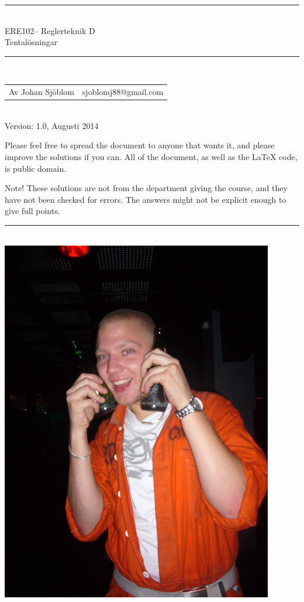 \documentclass[a4paper]{article}
\newcommand{\coursecode}{ERE102}
\newcommand{\coursename}{Reglerteknik D}
\newcommand{\doctitle}{Tentalösningar}
\newcommand{\horrule}[1]{\rule{\linewidth}{#1}} %
\begin{document}
\thispagestyle{plain} %


\begin{center}
\horrule{0.5pt} \\[0.3cm] %
%
\huge  \coursecode -- \coursename \\[1mm]
\Large \doctitle
\normalsize %

\horrule{2pt} \\[0.1cm] %

\begin{tabular}{ l r }
  Av Johan Sjöblom & sjoblomj88@gmail.com
\end{tabular}\\[0.1cm]
\footnotesize Version: 1.0, Augusti 2014\\[0.4cm]

\end{center}
{\footnotesize
Please feel free to spread the document to anyone that wants it, and please improve the solutions if you can. All of the document, as well as the \LaTeX{} code, is public domain.

Note! These solutions are not from the department giving the course, and they have not been checked for errors. The answers might not be explicit enough to give full points.\\
}
\horrule{0.5pt} %
\normalsize %
\\[2.5cm]

\resizebox{!}{120mm}
{\includegraphics{p1110461.jpg}}
\end{document}

